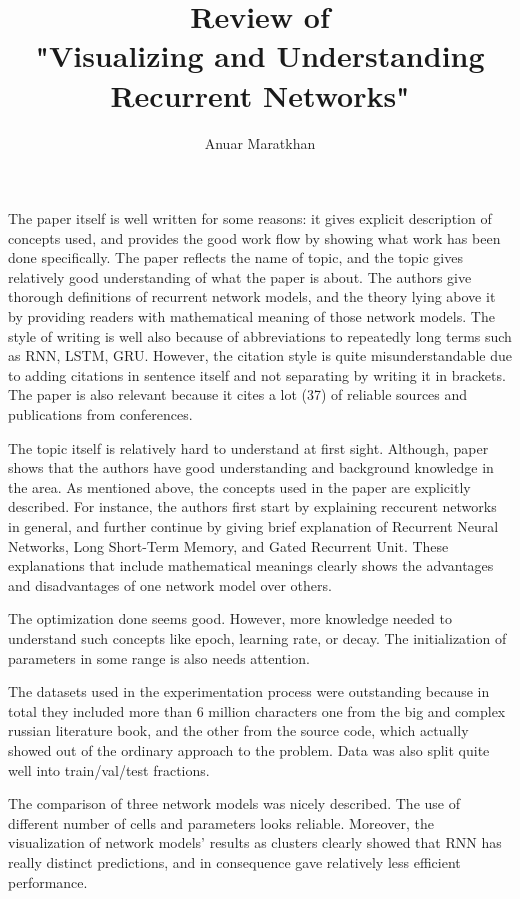 \documentclass{IEEEtran}
\begin{document}
\title{Review of \\"Visualizing and Understanding Recurrent Networks"}

\author{Anuar Maratkhan}

\maketitle

The paper itself is well written for some reasons: it gives explicit description of concepts used, and provides the good work flow by showing what work has been done specifically. The paper reflects the name of topic, and the topic gives  relatively good understanding of what the paper is about. The authors give thorough definitions of recurrent network models, and the theory lying above it by providing readers with mathematical meaning of those network models. The style of writing is well also because of abbreviations to repeatedly long terms such as RNN, LSTM, GRU. However, the citation style is quite misunderstandable due to adding citations in sentence itself and not separating by writing it in brackets. The paper is also relevant because it cites a lot (37) of reliable sources and publications from conferences.

The topic itself is relatively hard to understand at first sight. Although, paper shows that the authors have good understanding and background knowledge in the area. As mentioned above, the concepts used in the paper are explicitly described. For instance, the authors first start by explaining reccurent networks in general, and further continue by giving brief explanation of Recurrent Neural Networks, Long Short-Term Memory, and Gated Recurrent Unit. These explanations that include mathematical meanings clearly shows the advantages and disadvantages of one network model over others.

The optimization done seems good. However, more knowledge needed to understand such concepts like epoch, learning rate, or decay. The initialization of parameters in some range is also needs attention.

The datasets used in the experimentation process were outstanding because in total they included more than 6 million characters one from the big and complex russian literature book, and the other from the source code, which actually showed out of the ordinary approach to the problem. Data was also split quite well into train/val/test fractions.

The comparison of three network models was nicely described. The use of different number of cells and parameters looks reliable. Moreover, the visualization of network models' results as clusters clearly showed that RNN has really distinct predictions, and in consequence gave relatively less efficient performance.
\end{document}
